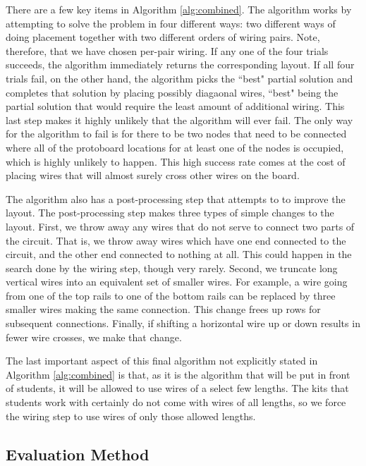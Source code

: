 There are a few key items in Algorithm \ref{alg:combined}. The algorithm works
by attempting to solve the problem in four different ways: two different ways of
doing placement together with two different orders of wiring pairs. Note,
therefore, that we have chosen per-pair wiring. If any one of the four trials
succeeds, the algorithm immediately returns the corresponding layout. If all
four trials fail, on the other hand, the algorithm picks the ``best" partial
solution and completes that solution by placing possibly diagaonal wires, ``best"
being the partial solution that would require the least amount of additional
wiring. This last step makes it highly unlikely that the algorithm will ever fail.
The only way for the algorithm to fail is for there to be two nodes that need to be
connected where all of the protoboard locations for at least one of the nodes is
occupied, which is highly unlikely to happen. This high success rate comes at the
cost of placing wires that will almost surely cross other wires on the board.

The algorithm also has a post-processing step that attempts to to improve the
layout. The post-processing step makes three types of simple changes to the
layout. First, we throw away any wires that do not serve to connect two parts
of the circuit. That is, we throw away wires which have one end connected to
the circuit, and the other end connected to nothing at all. This could happen
in the search done by the wiring step, though very rarely. Second, we truncate
long vertical wires into an equivalent set of smaller wires. For example, a wire
going from one of the top rails to one of the bottom rails can be replaced by
three smaller wires making the same connection. This change frees up rows for
subsequent connections. Finally, if shifting a horizontal wire up or down
results in fewer wire crosses, we make that change.

The last important aspect of this final algorithm not explicitly stated in
Algorithm \ref{alg:combined} is that, as it is the algorithm that will be put
in front of students, it will be allowed to use wires of a select few lengths.
The kits that students work with certainly do not come with wires of all lengths,
so we force the wiring step to use wires of only those allowed lengths.

\subsection{Evaluation Method}

